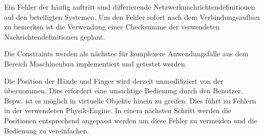\noindent\makebox[\linewidth]{\rule{\paperwidth}{0.4pt}}

Ein Fehler der häufig auftritt sind differierende
Netzwerknachrichtendefinitionen auf den beteiligten Systemen. Um
den Fehler sofort nach dem Verbindungsaufbau zu bemerken ist die Verwendung
einer Checksumme der verwendeten Nachrichtendefinitionen geplant.

Die Constraints werden als nächstes für komplexere
Anwendungsfälle aus dem Bereich Maschinenbau implementiert und getestet werden.

Die Position der Hände und Finger wird derzeit unmodifiziert von der
\constructionLogic übernommen. Dies erfordert eine umsichtige Bedienung durch
den Benutzer. Bspw. ist es möglich in virtuelle Objekte hinein zu greifen. Dies
führt zu Fehlern in der verwendeten Physik-Engine. In einem nächsten Schritt
werden die Positionen entsprechend angepasst werden um diese Fehler zu vermeiden
und die Bedienung zu vereinfachen.

\noindent\makebox[\linewidth]{\rule{\paperwidth}{0.4pt}}


